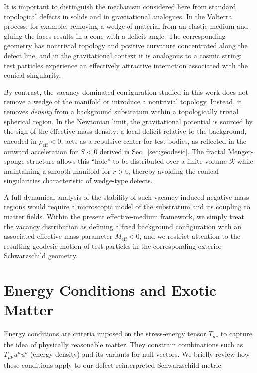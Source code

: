 \documentclass[%
  reprint,
  superscriptaddress,
  showpacs,
  showkeys,
  amsmath,amssymb,
  pra,
  longbibliography,
  floatfix,
  x11names
]{revtex4-2}
\begin{document}
It is important to distinguish the mechanism considered here from standard topological defects in solids and in gravitational analogues. In the Volterra process, for example, removing a wedge of material from an elastic medium and gluing the faces results in a cone with a deficit angle. The corresponding geometry has nontrivial topology and positive curvature concentrated along the defect line, and in the gravitational context it is analogous to a cosmic string: test particles experience an effectively attractive interaction associated with the conical singularity.

By contrast, the vacancy-dominated configuration studied in this work does not remove a wedge of the manifold or introduce a nontrivial topology. Instead, it removes \emph{density} from a background substratum within a topologically trivial spherical region. In the Newtonian limit, the gravitational potential is sourced by the sign of the effective mass density: a local deficit relative to the background, encoded in $\rho_{\text{eff}}<0$, acts as a repulsive center for test bodies, as reflected in the outward acceleration for $S<0$ derived in Sec.~\ref{sec:geodesic}. The fractal Menger-sponge structure allows this ``hole'' to be distributed over a finite volume $\mathcal{R}$ while maintaining a smooth manifold for $r>0$, thereby avoiding the conical singularities characteristic of wedge-type defects.

A full dynamical analysis of the stability of such vacancy-induced negative-mass regions would require a microscopic model of the substratum and its coupling to matter fields. Within the present effective-medium framework, we simply treat the vacancy distribution as defining a fixed background configuration with an associated effective mass parameter $M_{\text{eff}}<0$, and we restrict attention to the resulting geodesic motion of test particles in the corresponding exterior Schwarzschild geometry.



\section{Energy Conditions and Exotic Matter}
\label{sec:energy}

Energy conditions are criteria imposed on the stress-energy tensor \(T_{\mu\nu}\) to capture the idea of physically reasonable matter. They constrain combinations such as \(T_{\mu\nu}u^\mu u^\nu\) (energy density) and its variants for null vectors. We briefly review how these conditions apply to our defect-reinterpreted Schwarzschild metric.
\end{document}
